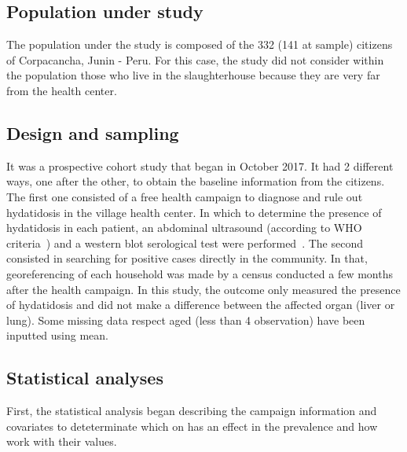 \documentclass[10pt,letterpaper]{article}
\begin{document}
\subsection*{Population under study}
The population under the study is composed of the 332 (141 at sample) citizens of Corpacancha, Junin - Peru. For this case, the study did not consider within the population those who live in the slaughterhouse because they are very far from the health center.


\subsection*{Design and sampling}
It was a prospective cohort study that began in October 2017.
It had 2 different ways, one after the other, to obtain the baseline information from the citizens. The first one consisted of a free health campaign to diagnose and rule out hydatidosis in the village health center. In which to determine the presence of hydatidosis in each patient, an abdominal ultrasound (according to WHO criteria~\cite{who2003international}) and a western blot serological test were performed~\cite{davelois2016rendimiento}. The second consisted in searching for positive cases directly in the community. In that, georeferencing of each household was made by a census conducted a few months after the health campaign. In this study, the outcome only measured the presence of hydatidosis and did not make a difference between the affected organ (liver or lung). Some missing data respect aged (less than 4 observation) have been inputted using mean.


\subsection*{Statistical analyses}
First, the statistical analysis began describing the campaign information and covariates to deteterminate which on has an effect in the prevalence and how work with their values.
\end{document}
